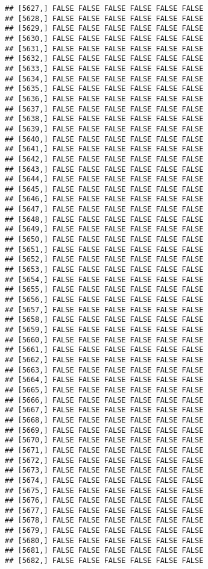 \documentclass[
]{article}
\begin{document}
\begin{verbatim}
## [5627,] FALSE FALSE FALSE FALSE FALSE FALSE
## [5628,] FALSE FALSE FALSE FALSE FALSE FALSE
## [5629,] FALSE FALSE FALSE FALSE FALSE FALSE
## [5630,] FALSE FALSE FALSE FALSE FALSE FALSE
## [5631,] FALSE FALSE FALSE FALSE FALSE FALSE
## [5632,] FALSE FALSE FALSE FALSE FALSE FALSE
## [5633,] FALSE FALSE FALSE FALSE FALSE FALSE
## [5634,] FALSE FALSE FALSE FALSE FALSE FALSE
## [5635,] FALSE FALSE FALSE FALSE FALSE FALSE
## [5636,] FALSE FALSE FALSE FALSE FALSE FALSE
## [5637,] FALSE FALSE FALSE FALSE FALSE FALSE
## [5638,] FALSE FALSE FALSE FALSE FALSE FALSE
## [5639,] FALSE FALSE FALSE FALSE FALSE FALSE
## [5640,] FALSE FALSE FALSE FALSE FALSE FALSE
## [5641,] FALSE FALSE FALSE FALSE FALSE FALSE
## [5642,] FALSE FALSE FALSE FALSE FALSE FALSE
## [5643,] FALSE FALSE FALSE FALSE FALSE FALSE
## [5644,] FALSE FALSE FALSE FALSE FALSE FALSE
## [5645,] FALSE FALSE FALSE FALSE FALSE FALSE
## [5646,] FALSE FALSE FALSE FALSE FALSE FALSE
## [5647,] FALSE FALSE FALSE FALSE FALSE FALSE
## [5648,] FALSE FALSE FALSE FALSE FALSE FALSE
## [5649,] FALSE FALSE FALSE FALSE FALSE FALSE
## [5650,] FALSE FALSE FALSE FALSE FALSE FALSE
## [5651,] FALSE FALSE FALSE FALSE FALSE FALSE
## [5652,] FALSE FALSE FALSE FALSE FALSE FALSE
## [5653,] FALSE FALSE FALSE FALSE FALSE FALSE
## [5654,] FALSE FALSE FALSE FALSE FALSE FALSE
## [5655,] FALSE FALSE FALSE FALSE FALSE FALSE
## [5656,] FALSE FALSE FALSE FALSE FALSE FALSE
## [5657,] FALSE FALSE FALSE FALSE FALSE FALSE
## [5658,] FALSE FALSE FALSE FALSE FALSE FALSE
## [5659,] FALSE FALSE FALSE FALSE FALSE FALSE
## [5660,] FALSE FALSE FALSE FALSE FALSE FALSE
## [5661,] FALSE FALSE FALSE FALSE FALSE FALSE
## [5662,] FALSE FALSE FALSE FALSE FALSE FALSE
## [5663,] FALSE FALSE FALSE FALSE FALSE FALSE
## [5664,] FALSE FALSE FALSE FALSE FALSE FALSE
## [5665,] FALSE FALSE FALSE FALSE FALSE FALSE
## [5666,] FALSE FALSE FALSE FALSE FALSE FALSE
## [5667,] FALSE FALSE FALSE FALSE FALSE FALSE
## [5668,] FALSE FALSE FALSE FALSE FALSE FALSE
## [5669,] FALSE FALSE FALSE FALSE FALSE FALSE
## [5670,] FALSE FALSE FALSE FALSE FALSE FALSE
## [5671,] FALSE FALSE FALSE FALSE FALSE FALSE
## [5672,] FALSE FALSE FALSE FALSE FALSE FALSE
## [5673,] FALSE FALSE FALSE FALSE FALSE FALSE
## [5674,] FALSE FALSE FALSE FALSE FALSE FALSE
## [5675,] FALSE FALSE FALSE FALSE FALSE FALSE
## [5676,] FALSE FALSE FALSE FALSE FALSE FALSE
## [5677,] FALSE FALSE FALSE FALSE FALSE FALSE
## [5678,] FALSE FALSE FALSE FALSE FALSE FALSE
## [5679,] FALSE FALSE FALSE FALSE FALSE FALSE
## [5680,] FALSE FALSE FALSE FALSE FALSE FALSE
## [5681,] FALSE FALSE FALSE FALSE FALSE FALSE
## [5682,] FALSE FALSE FALSE FALSE FALSE FALSE

\end{verbatim}
\end{document}
